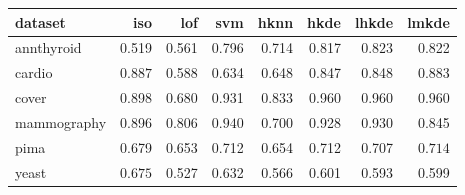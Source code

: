 \begin{tabular}{l|rrr|rrrr}
  \toprule
dataset & iso & lof & svm & hknn & hkde & lhkde & lmkde \\ 
  \midrule
annthyroid & 0.519 & 0.561 & 0.796 & 0.714 & 0.817 & $\bm{0.823}$ & 0.822 \\ 
  cardio & $\bm{0.887}$ & 0.588 & 0.634 & 0.648 & 0.847 & 0.848 & 0.883 \\ 
  cover & 0.898 & 0.680 & 0.931 & 0.833 & 0.960 & 0.960 & $\bm{0.960}$ \\ 
  mammography & 0.896 & 0.806 & $\bm{0.940}$ & 0.700 & 0.928 & 0.930 & 0.845 \\ 
  pima & 0.679 & 0.653 & 0.712 & 0.654 & 0.712 & 0.707 & $\bm{0.714}$ \\ 
  yeast & $\bm{0.675}$ & 0.527 & 0.632 & 0.566 & 0.601 & 0.593 & 0.599 \\ 
   \bottomrule
\end{tabular}
